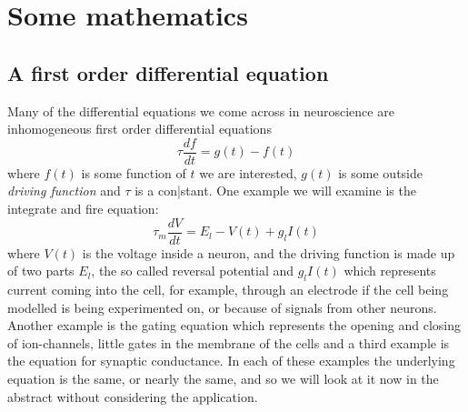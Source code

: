 \documentclass{article}
\begin{document}
\section*{Some mathematics}
\subsection*{A first order differential equation}
Many of the differential equations we come across in neuroscience are
inhomogeneous first order differential equations
\begin{equation}
\tau\frac{df}{dt}=g(t)-f(t)
\end{equation}
where $f(t)$ is some function of $t$ we are interested, $g(t)$ is some
outside \textsl{driving function} and $\tau$ is a con|stant. One
example we will examine is the integrate and fire equation:
\begin{equation}
\tau_m\frac{dV}{dt}=E_l-V(t)+g_lI(t)
\end{equation}
where $V(t)$ is the voltage inside a neuron, and the driving function
is made up of two parts $E_l$, the so called reversal potential and
$g_lI(t)$ which represents current coming into the cell, for example,
through an electrode if the cell being modelled is being experimented
on, or because of signals from other neurons. Another example is the
gating equation which represents the opening and closing of
ion-channels, little gates in the membrane of the cells and a third
example is the equation for synaptic conductance. In each of these
examples the underlying equation is the same, or nearly the same, and
so we will look at it now in the abstract without considering the
application.
\end{document}
